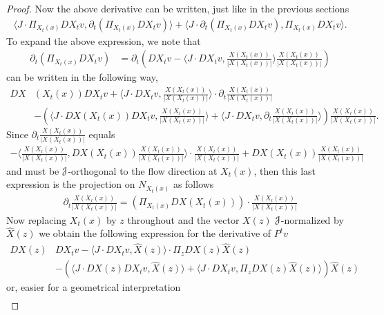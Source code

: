 \documentclass[12pt,reqno]{amsart}
\numberwithin{equation}{section}
\theoremstyle{plain}
\theoremstyle{definition}
\newcommand{\J}{\EuScript{J}}
\begin{document}
\begin{proof}
  Now the above derivative can be written, just like in the
  previous sections
  \begin{align}\label{eq:Jderivative1}
    \langle J \cdot
    \Pi_{X_t(x)}DX_tv,\partial_t(\Pi_{X_t(x)}DX_tv)\rangle +
    \langle J\cdot \partial_t(\Pi_{X_t(x)}DX_tv),
    \Pi_{X_t(x)}DX_tv \rangle.
  \end{align}
  To expand the above expression, we note that
  \begin{align*}
    \partial_t(\Pi_{X_t(x)}DX_tv) &=
    \partial_t\left(DX_tv - \langle J \cdot DX_tv,
      \frac{X(X_t(x))}{|X(X_t(x))|}\rangle
      \frac{X(X_t(x))}{|X(X_t(x))|} \right)
  \end{align*}
  can be written in the following way,
  \begin{align*}
    DX&(X_t(x))DX_tv + \langle J \cdot DX_tv,
    \frac{X(X_t(x))}{|X(X_t(x))|}\rangle\cdot
    \partial_t \frac{X(X_t(x))}{|X(X_t(x))|}
    \\
    &-\left( \langle J \cdot DX(X_t(x))DX_tv,
      \frac{X(X_t(x))}{|X(X_t(x))|}\rangle + \langle J \cdot
      DX_tv,
      \partial_t \frac{X(X_t(x))}{|X(X_t(x))|}\rangle
    \right) \frac{X(X_t(x))}{|X(X_t(x))|}.
  \end{align*}
  Since $\partial_t \frac{X(X_t(x))}{|X(X_t(x))|}$ equals
  \begin{align*}
     -\langle
    \frac{X(X_t(x))}{|X(X_t(x))|} ,
    DX(X_t(x))\frac{X(X_t(x))}{|X(X_t(x))|} \rangle \cdot
    \frac{X(X_t(x))}{|X(X_t(x))|} +
    DX(X_t(x))\frac{X(X_t(x))}{|X(X_t(x))|}
  \end{align*}
  and must be $\J$-orthogonal to the flow direction at
  $X_t(x)$, then this last expression is the projection on
  $N_{X_t(x)}$ as follows
  \begin{align*}
    \partial_t \frac{X(X_t(x))}{|X(X_t(x))|} = \left(
      \Pi_{X_t(x)}
      DX(X_t(x))\right)\cdot\frac{X(X_t(x))}{|X(X_t(x))|}
  \end{align*}
  Now replacing $X_t(x)$ by $z$ throughout and the vector
  $X(z)$ $\J$-normalized by $\hat X(z)$ we obtain the following
  expression for the derivative of $P^tv$
  \begin{align*}
    DX(z)&DX_tv - \langle J \cdot DX_tv, \hat X(z)\rangle
    \cdot \Pi_zDX(z)\hat X(z)
    \\
    &-\left( \langle J \cdot DX(z)DX_tv, \hat X(z)\rangle +
      \langle J \cdot DX_tv, \Pi_zDX(z)\hat X(z) \rangle
    \right) \hat X(z)
  \end{align*}
  or, easier for a geometrical interpretation
  \begin{align*}

\end{align*}
\end{proof}
\end{document}
